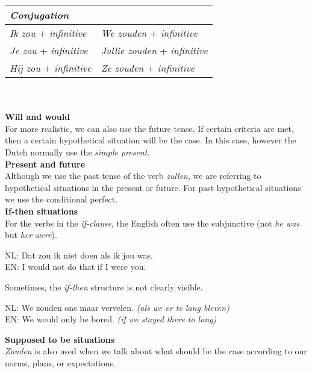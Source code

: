 \documentclass[letterpaper,11pt]{article}
\begin{document}
\begin{tabular}[t]{l l}
    \textit{Conjugation} \\
    \hline
    \textit{Ik zou} + \textit{infinitive} & \textit{We zouden} + \textit{infinitive} \\
    \textit{Je zou} + \textit{infinitive} & \textit{Jullie zouden} + \textit{infinitive} \\
    \textit{Hij zou} + \textit{infinitive} & \textit{Ze zouden} + \textit{infinitive} \\
    \hline
\end{tabular}
\\ \\
\textbf{Will and would} \\
For more realistic, we can also use the future tense. If certain criteria are
met, then a certain hypothetical situation will be the case. In this case,
however the Dutch normally use the \textit{simple present}.
\\
\textbf{Present and future} \\
Although we use the past tense of the verb \textit{zullen}, we are referring to
hypothetical situations in the present or future. For past hypothetical
situations we use the conditional perfect.
\\
\textbf{If-then situations} \\
For the verbs in the \textit{if-clause}, the English often use the
subjunctive (not \textit{he was} but \textit{her were}).
\\
\begin{small}
    \indent NL: Dat zou ik niet doen als ik jou was. \\
    \indent EN: I would not do that if I were you. \\
\end{small}
Sometimes, the \textit{if-then} structure is not clearly visible.
\\
\begin{small}
    \indent NL: We zouden ons maar vervelen. \textit{(als we er te lang bleven)} \\
    \indent EN: We would only be bored. \textit{(if we stayed there to long)} \\
\end{small}
\textbf{Supposed to be situations} \\
\textit{Zouden} is also used when we talk about what should be the case
according to our norms, plans, or expectations. \\
\end{document}
